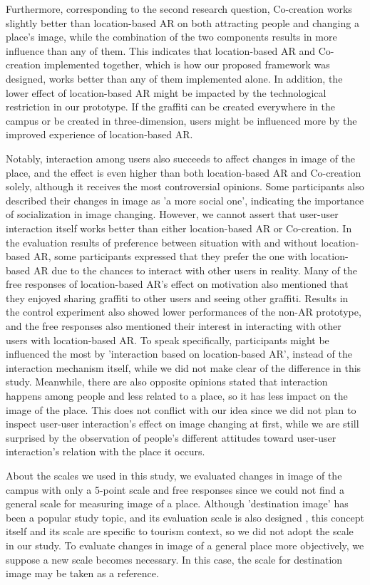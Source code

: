 Furthermore, corresponding to the second research question, Co-creation works slightly better than location-based AR on both attracting people and changing a place's image, while the combination of the two components results in more influence than any of them.
This indicates that location-based AR and Co-creation implemented together, which is how our proposed framework was designed, works better than any of them implemented alone.
In addition, the lower effect of location-based AR might be impacted by the technological restriction in our prototype. If the graffiti can be created everywhere in the campus or be created in three-dimension, users might be influenced more by the improved experience of location-based AR.

Notably, interaction among users also succeeds to affect changes in image of the place, and the effect is even higher than both location-based AR and Co-creation solely, although it receives the most controversial opinions.
Some participants also described their changes in image as 'a more social one', indicating the importance of socialization in image changing.
However, we cannot assert that user-user interaction itself works better than either location-based AR or Co-creation.
In the evaluation results of preference between situation with and without location-based AR, some participants expressed that they prefer the one with location-based AR due to the chances to interact with other users in reality.
Many of the free responses of location-based AR's effect on motivation also mentioned that they enjoyed sharing graffiti to other users and seeing other graffiti. 
Results in the control experiment also showed lower performances of the non-AR prototype, and the free responses also mentioned their interest in interacting with other users with location-based AR.
To speak specifically, participants might be influenced the most by 'interaction based on location-based AR', instead of the interaction mechanism itself, while we did not make clear of the difference in this study.
Meanwhile, there are also opposite opinions stated that interaction happens among people and less related to a place, so it has less impact on the image of the place.
This does not conflict with our idea since we did not plan to inspect user-user interaction's effect on image changing at first, while we are still surprised by the observation of people's different attitudes toward user-user interaction's relation with the place it occurs.

About the scales we used in this study, we evaluated changes in image of the campus with only a 5-point scale and free responses since we could not find a general scale for measuring image of a place.
Although 'destination image' has been a popular study topic, and its evaluation scale is also designed \cite{byon_zhang_2010}, this concept itself and its scale are specific to tourism context, so we did not adopt the scale in our study.
To evaluate changes in image of a general place more objectively, we suppose a new scale becomes necessary. In this case, the scale for destination image may be taken as a reference.

